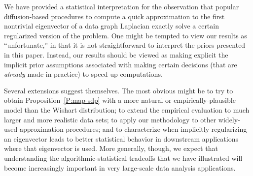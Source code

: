 \documentclass[12pt]{article}
\theoremstyle{plain}
\begin{document}
We have provided a statistical interpretation for the observation that 
popular diffusion-based procedures to compute a quick approximation to the 
first nontrivial eigenvector of a data graph Laplacian exactly solve a 
certain regularized version of the problem.
One might be tempted to view our results as ``unfortunate,'' in that it is 
not straightforward to interpret the priors presented in this paper.
Instead, our results should be viewed as making explicit the implicit prior 
assumptions associated with making certain decisions (that are \emph{already} 
made in practice) to speed up computations.

Several extensions suggest themselves.
The most obvious might be to try to obtain Proposition~\ref{P:map-sdp} with 
a more natural or empirically-plausible model than the Wishart distribution; 
to extend the empirical evaluation to much larger and more realistic data 
sets; to apply our methodology to other widely-used approximation 
procedures; and to characterize when implicitly regularizing an eigenvector 
leads to better statistical behavior in downstream applications where that 
eigenvector is used.
More generally, though, we expect that understanding the 
algorithmic-statistical tradeoffs that we have illustrated will become 
increasingly important in very large-scale data analysis applications.



\newpage




\newpage
\appendix



\end{document}
